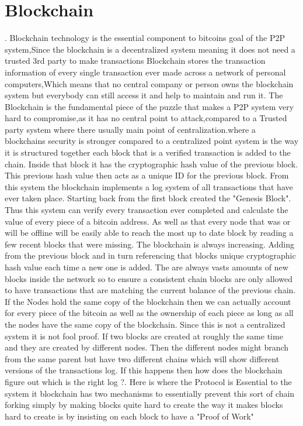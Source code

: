 \documentclass[report]{IEEEtran}
\begin{document}
\section{Blockchain}.\newline
Blockchain technology is the essential component to bitcoins goal of the P2P system,Since the blockchain is a decentralized system meaning it does not need a trusted 3rd party to make transactions \newline Blockchain stores the transaction information of every single transaction ever made across a network of personal computers,Which means that no central company or person owns the blockchain system but everybody can still access it and help to maintain and run it. The Blockchain is the fundamental piece of the puzzle that makes a P2P system very hard to compromise,as it has no central point to attack,compared to a Trusted party system where there usually main point of centralization.where a blockchains security is stronger compared to a centralized point system is the way it is structured together each block that is  a verified transaction is added to the chain. Inside that block it has the cryptographic hash value of the previous block. This previous hash value then acts as a unique ID for the previous block. From this system the blockchain implements a log system of all transactions that have ever taken place. Starting back from the first block created the "Genesis Block". Thus this system can verify every transaction ever completed and calculate the value of every piece of a bitcoin address. As well as that every node that was or will be offline will be easily able to reach the most up to date  block by reading a few recent blocks that were missing. The blockchain is always increasing. Adding from the previous block and in turn referencing that blocks unique cryptographic hash value each time a new one is added. The are always vasts amounts of new blocks inside the network so to ensure a consistent chain blocks are only allowed to have transactions that are matching the current balance of the previous chain. If the Nodes hold the same copy of the blockchain then we can actually account for every piece of the bitcoin as well as the ownership of each piece as long as all the nodes have the same copy of the blockchain. Since this is not a centralized system it is not fool proof. If two blocks are created at roughly the same time and they are created by different nodes. Then the different nodes might branch from the same parent but have two different chains which will show different versions of the transactions log. If this happens then how does the blockchain figure out which is the right log ?. Here is where the  Protocol is Essential to the system it blockchain has two mechanisms to essentially prevent this sort of chain forking simply by making blocks quite hard to create the way it makes blocks hard to create is by insisting on each block to have a "Proof of Work"   
\end{document}
